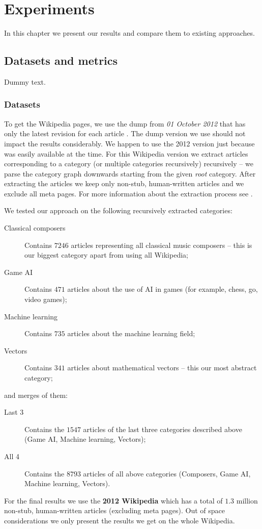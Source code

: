 \chapter{Experiments}

In this chapter we present our results and compare them to existing approaches.

\section{Datasets and metrics}

Dummy text.

\subsection{Datasets}

To get the Wikipedia pages, we use the dump from \emph{01 October 2012} that
has only the latest revision for each article . The dump version we use should not impact the results considerably. We
happen to use the 2012 version just because was easily available at the time.
For this Wikipedia version we extract articles corresponding to a category (or
multiple categories recursively) recursively -- we parse the category graph
downwards starting from the given \emph{root} category. After extracting the
articles we keep only non-stub, human-written articles and we exclude all meta
pages. For more information about the extraction process see
.

We tested our approach on the following recursively extracted categories:
\begin{description}
  \item[Classical composers] Contains \(7246\) articles representing all
  classical music composers -- this is our biggest category apart from using all
  Wikipedia;
  \item[Game \acl{AI}] Contains \(471\) articles about the use
  of \ac{AI} in games (for example, chess, go, video games);
  \item[Machine learning] Contains \(735\) articles about the machine learning
  field;
  \item[Vectors] Contains \(341\) articles about mathematical vectors -- this
  our most abstract category;
\end{description}
and merges of them:
\begin{description}
  \item[Last 3] Contains the \(1547\) articles of the last three categories
  described above (Game \ac{AI}, Machine learning, Vectors);
  \item[All 4] Contains the \(8793\) articles of all above categories
  (Composers, Game \ac{AI}, Machine learning, Vectors).
\end{description}
For the final results we use the \textbf{2012 Wikipedia} which has a total of
\(1.3\) million  non-stub, human-written
articles (excluding meta pages). Out of space considerations we only present
the results we get on the whole Wikipedia.

